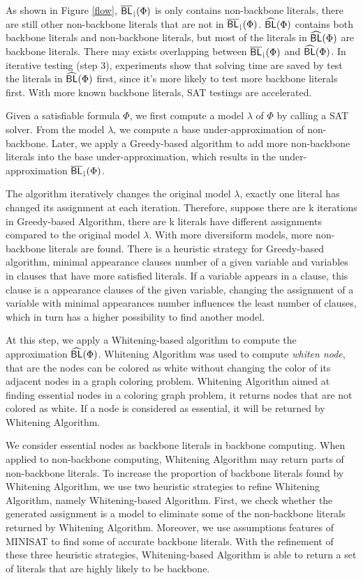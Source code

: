 As shown in Figure \ref{flow}, ${\sf \overline{BL}_\downharpoonright}(\Phi)$ is only contains non-backbone literals, there are still other non-backbone literals that are not in ${\sf \overline{BL}_\downharpoonright}(\Phi)$.
${\sf \widehat{BL}}(\Phi)$ contains both backbone literals and non-backbone literals, but most of the literals in ${\sf \widehat{BL}}(\Phi)$ are backbone literals. There may exists overlapping between ${\sf \overline{BL}_\downharpoonright}(\Phi)$ and ${\sf \widehat{BL}}(\Phi)$.
In iterative testing (step 3), experiments show that solving time are saved by test the literals in ${\sf \widehat{BL}}(\Phi)$ first, since it's more likely to test more backbone literals first. With more known backbone literals, SAT testings are accelerated.

\medskip
{}
Given a satisfiable formula $\Phi$, we first compute a model $\lambda$ of $\Phi$ by calling a SAT solver.
From the model $\lambda$, we compute a base under-approximation of non-backbone.
Later, we apply a Greedy-based algorithm to add more non-backbone literals into the base under-approximation, which results in the
under-approximation ${\sf \overline{BL}_\downharpoonright}(\Phi)$.

The algorithm iteratively changes the original model $\lambda$, exactly one literal has changed its assignment at each iteration. Therefore, suppose there are k iterations in Greedy-based Algorithm, there are k literals have different assignments compared to the original model $\lambda$. With more diversiform models, more non-backbone literals are found. There is a heuristic strategy for Greedy-based algorithm, minimal appearance clauses number of a given variable and variables in clauses that have more satisfied literals. If a variable appears in a clause, this clause is a appearance clauses of the given variable, changing the assignment of a variable with minimal appearances number influences the least number of clauses, which in turn has a higher possibility to find another model.

\medskip
{}
At this step, we apply a Whitening-based algorithm to compute the approximation ${\sf \widehat{BL}}(\Phi)$.
Whitening Algorithm was used to compute \emph{whiten node}, that are the nodes can be colored as white without changing the color of its adjacent nodes in a graph coloring problem.
Whitening Algorithm aimed at finding essential nodes in a coloring graph problem, it returns nodes that are not colored as white. If a node is considered as essential, it will be returned by Whitening Algorithm.

We consider essential nodes as backbone literals in backbone computing. When applied to non-backbone computing, Whitening Algorithm may return parts of non-backbone literals.
To increase the proportion of backbone literals found by Whitening Algorithm, we use two heuristic strategies to refine Whitening Algorithm, namely Whitening-based Algorithm.
First, we check whether the generated assignment is a model to eliminate some of the non-backbone literals returned by Whitening Algorithm.
Moreover, we use assumptions features of MINISAT \cite{JLM15} to find some of accurate backbone literals.
With the refinement of these three heuristic strategies, Whitening-based Algorithm is able to return a set of literals that are highly likely to be backbone.


